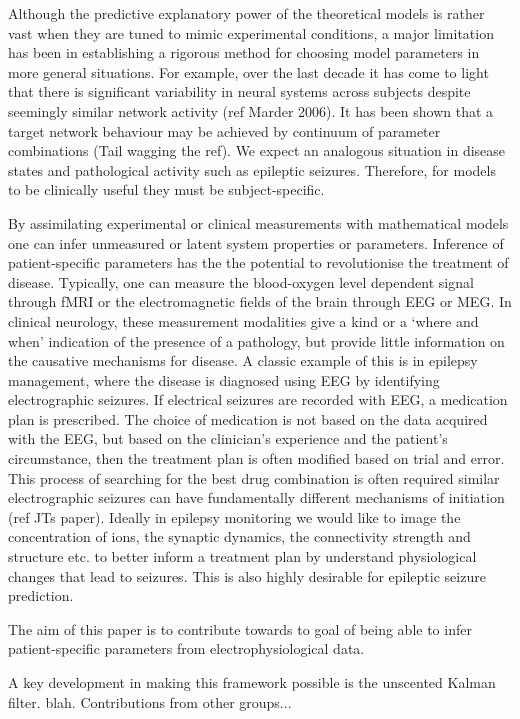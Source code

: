 \documentclass[]{article}
\begin{document}
Although the predictive explanatory power of the theoretical models is rather vast when they are tuned to mimic experimental conditions, a major limitation has been in establishing a rigorous method for choosing model parameters in more general situations. For example, over the last decade it has come to light that there is significant variability in neural systems across subjects despite seemingly similar network activity (ref Marder 2006). It has been shown that a target network behaviour may be achieved by continuum of parameter combinations (Tail wagging the ref). We expect an analogous situation in disease states and pathological activity such as epileptic seizures. Therefore, for models to be clinically useful they must be subject-specific. 

By assimilating experimental or clinical measurements with mathematical models one can infer unmeasured or latent system properties or parameters. Inference of patient-specific parameters has the the potential to revolutionise the treatment of disease. Typically, one can measure the blood-oxygen level dependent signal through fMRI or the electromagnetic fields of the brain through EEG or MEG. In clinical neurology, these measurement modalities give a kind or a `where and when' indication of the presence of a pathology, but provide little information on the causative mechanisms for disease. A classic example of this is in epilepsy management, where the disease is diagnosed using EEG by identifying electrographic seizures. If electrical seizures are recorded with EEG, a medication plan is prescribed. The choice of medication is not based on the data acquired with the EEG, but based on the clinician's experience and the patient’s circumstance, then the treatment plan is often modified based on trial and error. This process of searching for the best drug combination is often required similar electrographic seizures can have fundamentally different mechanisms of initiation (ref JTs paper). Ideally in epilepsy monitoring we would like to image the concentration of ions, the synaptic dynamics, the connectivity strength and structure etc. to better inform a treatment plan by understand physiological changes that lead to seizures. This is also highly desirable for epileptic seizure prediction.

The aim of this paper is to contribute towards to goal of being able to infer patient-specific parameters from electrophysiological data. 

A key development in making this framework possible is the unscented Kalman filter. blah. 
Contributions from other groups...
\end{document}
